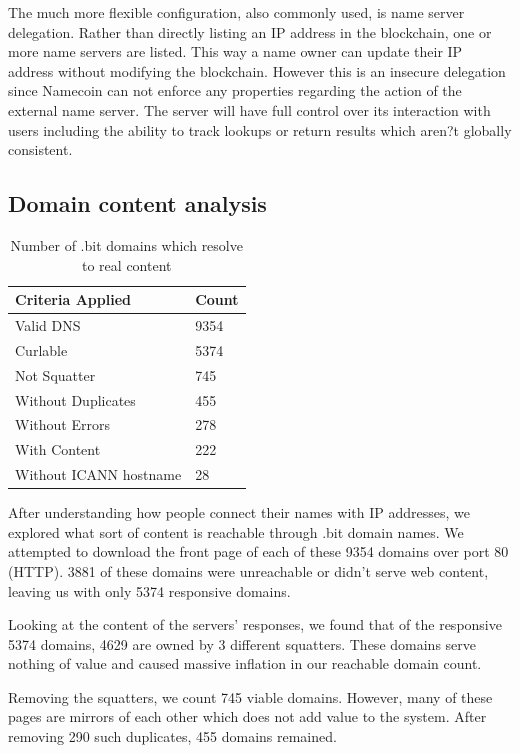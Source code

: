The much more flexible configuration, also commonly used, is name server delegation. Rather than directly listing an IP address in the blockchain, one or more name servers are listed. This way a name owner can update their IP address without modifying the blockchain. However this is an insecure delegation since Namecoin can not enforce any properties regarding the action of the external name server. The server will have full control over its interaction with users including the ability to track lookups or return results which aren?t globally consistent.

\subsection{Domain content analysis}
\label{domainbreakdown}

\begin{table}[t]
\centering
\begin{tabular}{ll}
Criteria Applied & Count \\ \hline
Valid DNS          &  9354  \\
Curlable        & 5374     \\
Not Squatter        & 745     \\
Without Duplicates      & 455     \\
Without Errors              & 278    \\
With Content              & 222    \\
Without ICANN hostname   & 28   \\
\end{tabular}
\caption{Number of .bit domains which resolve to real content}
\end{table}

After understanding how people connect their names with IP addresses, we explored what sort of content is reachable through .bit domain names. We attempted to download the front page of each of these 9354 domains over port 80 (HTTP). 3881 of these domains were unreachable or didn't serve web content, leaving us with only 5374 responsive domains.

Looking at the content of the servers' responses, we found that of the responsive 5374 domains, 4629 are owned by 3 different squatters. These domains serve nothing of value and caused massive inflation in our reachable domain count.

Removing the squatters, we count 745 viable domains. However, many of these pages are mirrors of each other which does not add value to the system. After removing 290 such duplicates, 455 domains remained.

